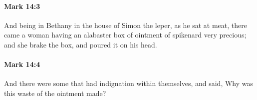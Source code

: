 		\paragraph{Mark 14:3} %
			\label{MARK-14-3}

			And being in Bethany in the house of Simon the leper, as he sat at meat, there came a woman having an alabaster box of ointment of spikenard very precious; and she brake the box, and poured it on his head.

			\begin{framed}
			\scriptsize
				\begin{compactdesc}
					\item[SBLG] 
				\end{compactdesc}
			\end{framed}

		\paragraph{Mark 14:4} %
			\label{MARK-14-4}

			And there were some that had indignation within themselves, and said, Why was this waste of the ointment made?

